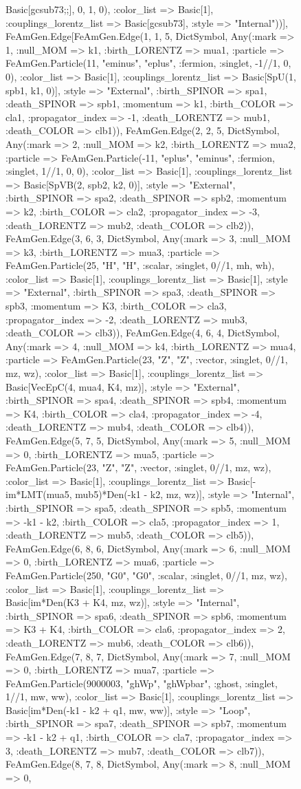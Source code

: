 \documentclass{revtex4}
\begin{document}
\begin{figure}[!htb]
\begin{center}
{Basic[gcsub73;;], 0, 1, 0), :color_list => Basic[1], :couplings_lorentz_list => Basic[gcsub73], :style => "Internal"))], FeAmGen.Edge[FeAmGen.Edge(1, 1, 5, Dict{Symbol, Any}(:mark => 1, :null_MOM => k1, :birth_LORENTZ => mua1, :particle => FeAmGen.Particle(11, "eminus", "eplus", :fermion, :singlet, -1//1, 0, 0), :color_list => Basic[1], :couplings_lorentz_list => Basic[SpU(1, spb1, k1, 0)], :style => "External", :birth_SPINOR => spa1, :death_SPINOR => spb1, :momentum => k1, :birth_COLOR => cla1, :propagator_index => -1, :death_LORENTZ => mub1, :death_COLOR => clb1)), FeAmGen.Edge(2, 2, 5, Dict{Symbol, Any}(:mark => 2, :null_MOM => k2, :birth_LORENTZ => mua2, :particle => FeAmGen.Particle(-11, "eplus", "eminus", :fermion, :singlet, 1//1, 0, 0), :color_list => Basic[1], :couplings_lorentz_list => Basic[SpVB(2, spb2, k2, 0)], :style => "External", :birth_SPINOR => spa2, :death_SPINOR => spb2, :momentum => k2, :birth_COLOR => cla2, :propagator_index => -3, :death_LORENTZ => mub2, :death_COLOR => clb2)), FeAmGen.Edge(3, 6, 3, Dict{Symbol, Any}(:mark => 3, :null_MOM => k3, :birth_LORENTZ => mua3, :particle => FeAmGen.Particle(25, "H", "H", :scalar, :singlet, 0//1, mh, wh), :color_list => Basic[1], :couplings_lorentz_list => Basic[1], :style => "External", :birth_SPINOR => spa3, :death_SPINOR => spb3, :momentum => K3, :birth_COLOR => cla3, :propagator_index => -2, :death_LORENTZ => mub3, :death_COLOR => clb3)), FeAmGen.Edge(4, 6, 4, Dict{Symbol, Any}(:mark => 4, :null_MOM => k4, :birth_LORENTZ => mua4, :particle => FeAmGen.Particle(23, "Z", "Z", :vector, :singlet, 0//1, mz, wz), :color_list => Basic[1], :couplings_lorentz_list => Basic[VecEpC(4, mua4, K4, mz)], :style => "External", :birth_SPINOR => spa4, :death_SPINOR => spb4, :momentum => K4, :birth_COLOR => cla4, :propagator_index => -4, :death_LORENTZ => mub4, :death_COLOR => clb4)), FeAmGen.Edge(5, 7, 5, Dict{Symbol, Any}(:mark => 5, :null_MOM => 0, :birth_LORENTZ => mua5, :particle => FeAmGen.Particle(23, "Z", "Z", :vector, :singlet, 0//1, mz, wz), :color_list => Basic[1], :couplings_lorentz_list => Basic[-im*LMT(mua5, mub5)*Den(-k1 - k2, mz, wz)], :style => "Internal", :birth_SPINOR => spa5, :death_SPINOR => spb5, :momentum => -k1 - k2, :birth_COLOR => cla5, :propagator_index => 1, :death_LORENTZ => mub5, :death_COLOR => clb5)), FeAmGen.Edge(6, 8, 6, Dict{Symbol, Any}(:mark => 6, :null_MOM => 0, :birth_LORENTZ => mua6, :particle => FeAmGen.Particle(250, "G0", "G0", :scalar, :singlet, 0//1, mz, wz), :color_list => Basic[1], :couplings_lorentz_list => Basic[im*Den(K3 + K4, mz, wz)], :style => "Internal", :birth_SPINOR => spa6, :death_SPINOR => spb6, :momentum => K3 + K4, :birth_COLOR => cla6, :propagator_index => 2, :death_LORENTZ => mub6, :death_COLOR => clb6)), FeAmGen.Edge(7, 8, 7, Dict{Symbol, Any}(:mark => 7, :null_MOM => 0, :birth_LORENTZ => mua7, :particle => FeAmGen.Particle(9000003, "ghWp", "ghWpbar", :ghost, :singlet, 1//1, mw, ww), :color_list => Basic[1], :couplings_lorentz_list => Basic[im*Den(-k1 - k2 + q1, mw, ww)], :style => "Loop", :birth_SPINOR => spa7, :death_SPINOR => spb7, :momentum => -k1 - k2 + q1, :birth_COLOR => cla7, :propagator_index => 3, :death_LORENTZ => mub7, :death_COLOR => clb7)), FeAmGen.Edge(8, 7, 8, Dict{Symbol, Any}(:mark => 8, :null_MOM => 0, }
\end{center}
\end{figure}
\end{document}
